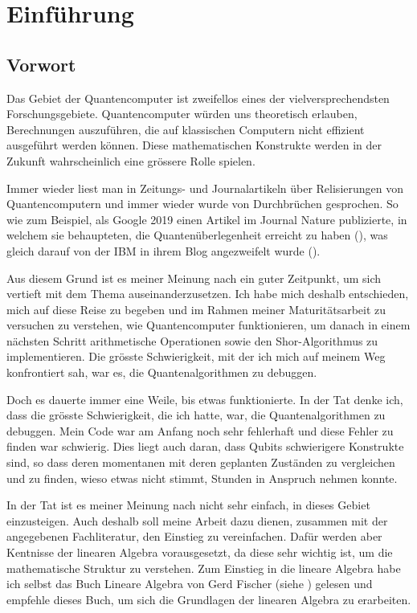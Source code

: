 \chapter{Einführung}
\section{Vorwort}
Das Gebiet der Quantencomputer ist zweifellos eines der vielversprechendsten Forschungsgebiete. Quantencomputer würden uns theoretisch erlauben, Berechnungen auszuführen, die auf klassischen Computern nicht effizient ausgeführt werden können. Diese mathematischen Konstrukte werden in der Zukunft wahrscheinlich eine grössere Rolle spielen. 

Immer wieder liest man in Zeitungs- und Journalartikeln über Relisierungen von Quantencomputern und immer wieder wurde von Durchbrüchen gesprochen. So wie zum Beispiel, als Google 2019 einen Artikel im Journal \grqq Nature\grqq{} publizierte, in welchem sie behaupteten, die \grqq Quantenüberlegenheit\grqq{} erreicht zu haben (\cite{GSP}), was gleich darauf von der IBM in ihrem Blog angezweifelt wurde (\cite{IBM}).

Aus diesem Grund ist es meiner Meinung nach ein guter Zeitpunkt, um sich vertieft mit dem Thema auseinanderzusetzen. Ich habe mich deshalb entschieden, mich auf diese Reise zu begeben und im Rahmen meiner Maturitätsarbeit zu versuchen zu verstehen, wie Quantencomputer funktionieren, um danach in einem nächsten Schritt arithmetische Operationen sowie den Shor-Algorithmus zu implementieren. Die grösste Schwierigkeit, mit der ich mich auf meinem Weg konfrontiert sah, war es, die Quantenalgorithmen zu debuggen.

Doch es dauerte immer eine Weile, bis etwas funktionierte. In der Tat denke ich, dass die grösste Schwierigkeit, die ich hatte, war, die Quantenalgorithmen zu debuggen. Mein Code war am Anfang noch sehr fehlerhaft und diese Fehler zu finden war schwierig. Dies liegt auch daran, dass Qubits schwierigere Konstrukte sind, so dass deren momentanen mit deren geplanten Zuständen zu vergleichen und zu finden, wieso etwas nicht stimmt, Stunden in Anspruch nehmen konnte.

In der Tat ist es meiner Meinung nach nicht sehr einfach, in dieses Gebiet einzusteigen. Auch deshalb soll meine Arbeit dazu dienen, zusammen mit der angegebenen Fachliteratur, den Einstieg zu vereinfachen. Dafür werden aber Kentnisse der linearen Algebra vorausgesetzt, da diese sehr wichtig ist, um die mathematische Struktur zu verstehen. Zum Einstieg in die lineare Algebra habe ich selbst das Buch \grqq Lineare Algebra\grqq{} von Gerd Fischer (siehe \cite{LA}) gelesen und empfehle dieses Buch, um sich die Grundlagen der linearen Algebra zu erarbeiten.

